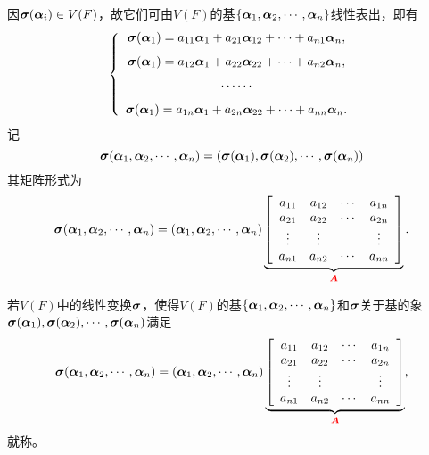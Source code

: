 \begin{frame}
  因$\boldsymbol{\sigma}(\boldsymbol{\alpha}_i)\in V(F)$，故它们可由$V(F)$的基$\{\boldsymbol{\alpha}_1,\boldsymbol{\alpha}_2,\cdots,\boldsymbol{\alpha}_n\}$线性表出，即有
  $$
  \left\{
    \begin{array}{c}
      \boldsymbol{\sigma}(\boldsymbol{\alpha}_1)=a_{11}\boldsymbol{\alpha}_{1}+a_{21}\boldsymbol{\alpha}_{12}+\cdots+a_{n1}\boldsymbol{\alpha}_{n}, \\[0.1in]
      \boldsymbol{\sigma}(\boldsymbol{\alpha}_1)=a_{12}\boldsymbol{\alpha}_{1}+a_{22}\boldsymbol{\alpha}_{22}+\cdots+a_{n2}\boldsymbol{\alpha}_{n}, \\[0.1in]
      \cdots\cdots\\[0.1in]
      \boldsymbol{\sigma}(\boldsymbol{\alpha}_1)=a_{1n}\boldsymbol{\alpha}_{1}+a_{2n}\boldsymbol{\alpha}_{22}+\cdots+a_{nn}\boldsymbol{\alpha}_{n}.
    \end{array}
  \right.
  $$
  记
  $$
  \boldsymbol{\sigma}(\boldsymbol{\alpha}_1,\boldsymbol{\alpha}_2,\cdots,\boldsymbol{\alpha}_n)=(\boldsymbol{\sigma}(\boldsymbol{\alpha}_1),\boldsymbol{\sigma}(\boldsymbol{\alpha}_2),\cdots,\boldsymbol{\sigma}(\boldsymbol{\alpha}_n))
  $$
  其矩阵形式为
  \begin{equation}\label{a_sigma}
  \boldsymbol{\sigma}(\boldsymbol{\alpha}_1,\boldsymbol{\alpha}_2,\cdots,\boldsymbol{\alpha}_n)=(\boldsymbol{\alpha}_1,\boldsymbol{\alpha}_2,\cdots,\boldsymbol{\alpha}_n)\underbrace{\left[
    \begin{array}{cccc}
      a_{11}&a_{12}&\cdots&a_{1n}\\
      a_{21}&a_{22}&\cdots&a_{2n}\\
      \vdots&\vdots&&\vdots\\
      a_{n1}&a_{n2}&\cdots&a_{nn}
    \end{array}
  \right]}_{\textcolor{red}{\boldsymbol{A}}}.
  \end{equation}

\end{frame}

\begin{frame}
  \begin{dingyi}
    若$V(F)$中的线性变换$\boldsymbol{\sigma}$，使得$V(F)$的基$\{\boldsymbol{\alpha}_1,\boldsymbol{\alpha}_2,\cdots,\boldsymbol{\alpha}_n\}$和$\boldsymbol{\sigma}$关于基的象$\boldsymbol{\sigma}(\boldsymbol{\alpha}_1),\boldsymbol{\sigma}(\boldsymbol{\alpha}_2),\cdots,\boldsymbol{\sigma}(\boldsymbol{\alpha}_n)$满足
    $$
    \boldsymbol{\sigma}(\boldsymbol{\alpha}_1,\boldsymbol{\alpha}_2,\cdots,\boldsymbol{\alpha}_n)=(\boldsymbol{\alpha}_1,\boldsymbol{\alpha}_2,\cdots,\boldsymbol{\alpha}_n)\underbrace{\left[
        \begin{array}{cccc}
          a_{11}&a_{12}&\cdots&a_{1n}\\
          a_{21}&a_{22}&\cdots&a_{2n}\\
          \vdots&\vdots&&\vdots\\
          a_{n1}&a_{n2}&\cdots&a_{nn}
        \end{array}
      \right]}_{\textcolor{red}{\boldsymbol{A}}},
    $$
    就称。
  \end{dingyi}
\end{frame}

